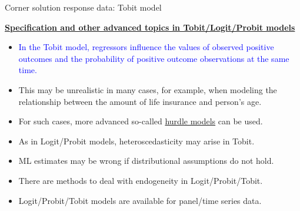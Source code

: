 \documentclass[usenames,dvipsnames]{beamer}
\begin{document}
\begin{frame}{Corner solution response data: Tobit model}

{\footnotesize
\underline{\textbf{Specification and other advanced topics in Tobit/Logit/Probit models}} \\
\begin{itemize}
\item \textcolor{Blue}{In the Tobit model, regressors influence the values of observed positive outcomes and the probability of positive outcome observations at the same time.}\\
\medskip
\item This may be unrealistic in many cases, for example, when modeling the relationship between the amount of life insurance and person's age.\\
\medskip
\item For such cases, more advanced so-called \underline{hurdle models} can be used.
\item As in Logit/Probit models, heteroscedasticity may arise in Tobit.\\
\medskip
\item ML estimates may be wrong if distributional assumptions do not hold.\\
\medskip
\item There are methods to deal with endogeneity in Logit/Probit/Tobit.\\
\medskip
\item Logit/Probit/Tobit models are available for panel/time series data.
\end{itemize}}
\end{frame}
\end{document}
